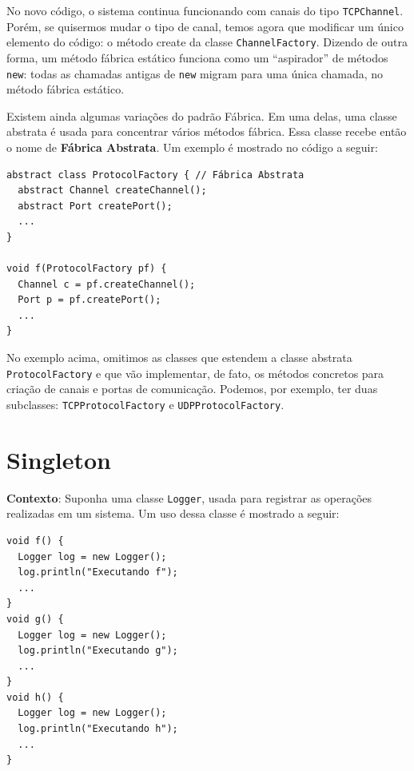 \documentclass[
  11pt,
  twoside]{book}
\newcommand{\passthrough}[1]{#1}
\begin{document}
No novo código, o sistema continua funcionando com canais do tipo
\passthrough{\lstinline!TCPChannel!}. Porém, se quisermos mudar o tipo
de canal, temos agora que modificar um único elemento do código: o
método create da classe \passthrough{\lstinline!ChannelFactory!}.
Dizendo de outra forma, um método fábrica estático funciona como um
``aspirador'' de métodos \passthrough{\lstinline!new!}: todas as
chamadas antigas de \passthrough{\lstinline!new!} migram para uma única
chamada, no método fábrica estático.

Existem ainda algumas variações do padrão Fábrica. Em uma delas, uma
classe abstrata é usada para concentrar vários métodos fábrica. Essa
classe recebe então o nome de \textbf{Fábrica Abstrata}. Um exemplo é
mostrado no código a seguir:

\begin{lstlisting}
abstract class ProtocolFactory { // Fábrica Abstrata
  abstract Channel createChannel();
  abstract Port createPort();  
  ...
}

void f(ProtocolFactory pf) {
  Channel c = pf.createChannel();
  Port p = pf.createPort();
  ...
}
\end{lstlisting}

No exemplo acima, omitimos as classes que estendem a classe abstrata
\passthrough{\lstinline!ProtocolFactory!} e que vão implementar, de
fato, os métodos concretos para criação de canais e portas de
comunicação. Podemos, por exemplo, ter duas subclasses:
\passthrough{\lstinline!TCPProtocolFactory!} e
\passthrough{\lstinline!UDPProtocolFactory!}.

\hypertarget{singleton}{%
\section{Singleton}\label{singleton}}

 

\textbf{Contexto}: Suponha uma classe \passthrough{\lstinline!Logger!},
usada para registrar as operações realizadas em um sistema. Um uso dessa
classe é mostrado a seguir:

\begin{lstlisting}
void f() {
  Logger log = new Logger();  
  log.println("Executando f");
  ...
}
void g() {
  Logger log = new Logger();  
  log.println("Executando g");
  ...
}
void h() {
  Logger log = new Logger();  
  log.println("Executando h");
  ...
}
\end{lstlisting}
\end{document}
